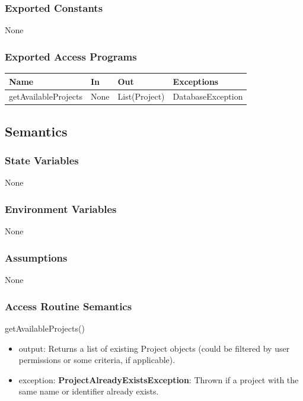 \documentclass[12pt, titlepage]{article}
\begin{document}
    \subsubsection{Exported Constants}
        None

    \subsubsection{Exported Access Programs}
    \begin{center}\begin{tabular}{p{3cm} p{3cm} p{3cm} p{3cm}}
    \hline\textbf{Name} & \textbf{In} & \textbf{Out} & \textbf{Exceptions} \\
    \hline
        getAvailableProjects & None & List(Project) & DatabaseException \\
    \hline
    \end{tabular}\end{center}

    \subsection{Semantics}
    \subsubsection{State Variables}
        None

    \subsubsection{Environment Variables}
        None

    \subsubsection{Assumptions}
        None

    \subsubsection{Access Routine Semantics}
        \noindent getAvailableProjects()
        \begin{itemize}
            \item output: Returns a list of existing Project objects (could be filtered by user permissions or some criteria, if applicable).
            \item exception: \textbf{ProjectAlreadyExistsException}: Thrown if a project with the same name or identifier already exists. 
        \end{itemize}
\end{document}
